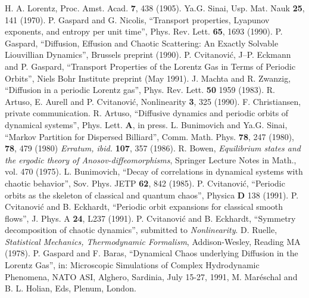 \eject
\begin{thebibliography}{10}

 H. A. Lorentz, Proc. Amst. Acad. {\bf 7}, 438 (1905).
 Ya.G. Sinai, Usp. Mat.  Nauk {\bf 25}, 141 (1970).
 P. Gaspard and G. Nicolis, ``Transport properties, Lyapunov
   exponents, and entropy per unit time'', Phys. Rev. Lett. {\bf 65}, 1693
   (1990).
 P. Gaspard, ``Diffusion, Effusion and Chaotic Scattering:
  An Exactly Solvable Liouvillian Dynamics'', Brussels preprint (1990).
 P. Cvitanovi\'c, J--P. Eckmann and P. Gaspard, ``Transport
  Properties of the Lorentz Gas in Terms of Periodic Orbits'', Niels
  Bohr Institute preprint (May 1991).
 J. Machta and R. Zwanzig, ``Diffusion in a periodic Lorentz gas'',
   Phys. Rev. Lett. {\bf 50} 1959 (1983).
 R. Artuso, E. Aurell and P. Cvitanovi\'c, Nonlinearity {\bf 3},
  325 (1990).
 F. Christiansen, private communication.
 R. Artuso, ``Diffusive dynamics and periodic orbits of dynamical
  systems'', Phys.  Lett. {\bf A}, in press.
 L. Bunimovich and Ya.G. Sinai, ``Markov Partition for Dispersed
  Billiard'', Comm. Math. Phys. {\bf 78}, 247 (1980), {\bf 78}, 479 (1980)
  {\sl Erratum,  ibid.} {\bf 107}, 357 (1986).
 R. Bowen, {\em Equilibrium states and the ergodic theory of
  Anosov-diffeomorphisms}, Springer Lecture Notes in Math., vol. 470 (1975).
 L. Bunimovich, ``Decay of correlations in dynamical systems with
  chaotic behavior'', Sov. Phys. JETP {\bf 62}, 842 (1985).
 P. Cvitanovi\'c, ``Periodic orbits as the skeleton of classical and
  quantum chaos'', Physica {\bf D} 138 (1991).
 P. Cvitanovi\'c and  B. Eckhardt, ``Periodic orbit expansions for
  classical smooth flows'', J. Phys. A {\bf 24}, L237 (1991).
 P. Cvitanovi\'c and  B. Eckhardt, ``Symmetry decomposition of
  chaotic dynamics'', submitted to {\em Nonlinearity}.
 D. Ruelle, {\em Statistical Mechanics, Thermodynamic Formalism},
Addison-Wesley, Reading MA (1978).
 P. Gaspard and  F. Baras, ``Dynamical Chaos underlying
Diffusion in the Lorentz Gas'', in: Microscopic Simulations of Complex
Hydrodynamic Phenomena, NATO ASI, Alghero, Sardinia, July 15-27, 1991,
M. Mar\'eschal and B. L. Holian, Eds, Plenum, London.
\end{thebibliography}

